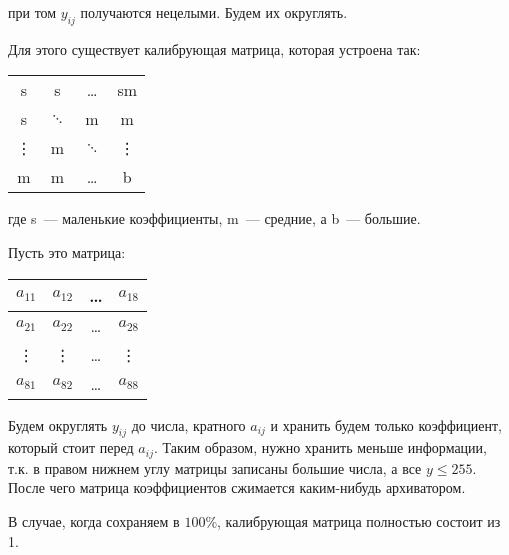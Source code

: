 при том $y_{ij}$ получаются нецелыми. Будем их округлять.
\vspace*{1.0em}

Для этого существует калибрующая матрица, которая устроена так:

\vspace*{1.0em}
\begin{tabular}{|c c c c|}
    \hline
    s      & s        & \ldots   & sm     \\
    s      & $\ddots$ & m        & m      \\
    \vdots & m        & $\ddots$ & \vdots \\
    m      & m        & \ldots   & b      \\
    \hline
\end{tabular}

где s~--- маленькие коэффициенты, m~--- средние, а  b~--- большие.\\
\vspace*{1.0em}

Пусть это матрица:

\begin{tabular}{|c|c|c|c|}
    \hline
    $a_{11}$ & $a_{12}$ & \ldots & $a_{18}$ \\
    \hline
    $a_{21}$ & $a_{22}$ & \ldots & $a_{28}$ \\
    \hline
    \vdots   & \vdots   & \ldots & \vdots   \\
    \hline
    $a_{81}$ & $a_{82}$ & \ldots & $a_{88}$ \\
    \hline
\end{tabular}
\vspace*{1.0em}

Будем округлять $y_{ij}$ до числа, кратного $a_{ij}$ и хранить будем только
коэффициент, который стоит перед $a_{ij}$. Таким образом, нужно хранить меньше
информации, т.к. в правом нижнем углу матрицы записаны большие числа, а все $y
    \leq 255$. После чего матрица коэффициентов сжимается каким-нибудь архиватором.
\begin{observation}
    В случае, когда сохраняем в $100\%$, калибрующая матрица полностью состоит из 1.
\end{observation}


\newpage

